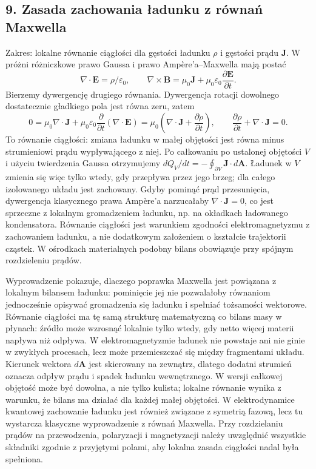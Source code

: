 \documentclass[11pt,a4paper]{article}
\begin{document}
\subsection{9. Zasada zachowania ładunku z równań Maxwella}
Zakres: lokalne równanie ciągłości dla gęstości ładunku \(\rho\) i gęstości prądu \(\mathbf J\). W próżni różniczkowe prawo Gaussa i prawo Ampère’a--Maxwella mają postać
\[
\nabla\cdot\mathbf E=\rho/\varepsilon_0,\qquad
\nabla\times\mathbf B=\mu_0\mathbf J+\mu_0\varepsilon_0\frac{\partial\mathbf E}{\partial t}.
\]
Bierzemy dywergencję drugiego równania. Dywergencja rotacji dowolnego dostatecznie gładkiego pola jest równa zeru, zatem
\[
0=\mu_0\nabla\cdot\mathbf J+
\mu_0\varepsilon_0\frac{\partial}{\partial t}(\nabla\cdot\mathbf E)
=\mu_0\left(\nabla\cdot\mathbf J+\frac{\partial\rho}{\partial t}\right),
\qquad
\frac{\partial\rho}{\partial t}+\nabla\cdot\mathbf J=0.
\]
To równanie ciągłości: zmiana ładunku w małej objętości jest równa minus strumieniowi prądu wypływającego z niej. Po całkowaniu po ustalonej objętości \(V\) i użyciu twierdzenia Gaussa otrzymujemy \(dQ_V/dt=-\oint_{\partial V}\mathbf J\cdot d\mathbf A\). Ładunek w \(V\) zmienia się więc tylko wtedy, gdy przepływa przez jego brzeg; dla całego izolowanego układu jest zachowany. Gdyby pominąć prąd przesunięcia, dywergencja klasycznego prawa Ampère’a narzucałaby \(\nabla\cdot\mathbf J=0\), co jest sprzeczne z lokalnym gromadzeniem ładunku, np. na okładkach ładowanego kondensatora. Równanie ciągłości jest warunkiem zgodności elektromagnetyzmu z zachowaniem ładunku, a nie dodatkowym założeniem o kształcie trajektorii cząstek. W ośrodkach materialnych podobny bilans obowiązuje przy spójnym rozdzieleniu prądów.

Wyprowadzenie pokazuje, dlaczego poprawka Maxwella jest powiązana z lokalnym bilansem ładunku: pominięcie jej nie pozwalałoby równaniom jednocześnie opisywać gromadzenia się ładunku i spełniać tożsamości wektorowe. Równanie ciągłości ma tę samą strukturę matematyczną co bilans masy w płynach: źródło może wzrosnąć lokalnie tylko wtedy, gdy netto więcej materii napływa niż odpływa. W elektromagnetyzmie ładunek nie powstaje ani nie ginie w zwykłych procesach, lecz może przemieszczać się między fragmentami układu. Kierunek wektora \(d\mathbf A\) jest skierowany na zewnątrz, dlatego dodatni strumień oznacza odpływ prądu i spadek ładunku wewnętrznego. W wersji całkowej objętość może być dowolna, a nie tylko kulista; lokalne równanie wynika z warunku, że bilans ma działać dla każdej małej objętości. W elektrodynamice kwantowej zachowanie ładunku jest również związane z symetrią fazową, lecz tu wystarcza klasyczne wyprowadzenie z równań Maxwella. Przy rozdzielaniu prądów na przewodzenia, polaryzacji i magnetyzacji należy uwzględnić wszystkie składniki zgodnie z przyjętymi polami, aby lokalna zasada ciągłości nadal była spełniona.
\end{document}
